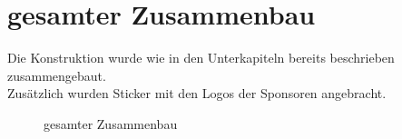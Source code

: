 \clearpage
\section{gesamter Zusammenbau}
Die Konstruktion wurde wie in den Unterkapiteln bereits beschrieben zusammengebaut.\\
Zusätzlich wurden Sticker mit den Logos der Sponsoren angebracht.
\begin{figure}[H]
    \centering
    \caption{gesamter Zusammenbau}
\end{figure}

